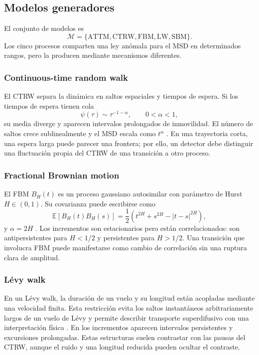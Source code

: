 \documentclass[a4paper,12pt]{article}
\newcommand{\E}{\mathbb{E}}
\newcommand{\Mset}{\mathcal{M}}
\begin{document}
\subsection{Modelos generadores}

El conjunto de modelos es
\[
  \Mset=\{\mathrm{ATTM},\mathrm{CTRW},\mathrm{FBM},\mathrm{LW},\mathrm{SBM}\}.
\]
Los cinco procesos comparten una ley anómala para el MSD en determinados rangos, pero la producen mediante mecanismos diferentes.

\subsubsection{Continuous-time random walk}

El CTRW separa la dinámica en saltos espaciales y tiempos de espera. Si los tiempos de espera tienen cola
\begin{equation}
  \psi(\tau)\sim \tau^{-1-\alpha},\qquad 0<\alpha<1,
\end{equation}
su media diverge y aparecen intervalos prolongados de inmovilidad. El número de saltos crece sublinealmente y el MSD escala como $t^{\alpha}$ \cite{montroll1965random,metzler2000random}. En una trayectoria corta, una espera larga puede parecer una frontera; por ello, un detector debe distinguir una fluctuación propia del CTRW de una transición a otro proceso.

\subsubsection{Fractional Brownian motion}

El FBM $B_H(t)$ es un proceso gaussiano autosimilar con parámetro de Hurst $H\in(0,1)$. Su covarianza puede escribirse como
\begin{equation}
  \E[B_H(t)B_H(s)]=\frac{1}{2}\left(t^{2H}+s^{2H}-|t-s|^{2H}\right),
  \label{eq:fbm-cov}
\end{equation}
y $\alpha=2H$ \cite{mandelbrot1968fractional}. Los incrementos son estacionarios pero están correlacionados: son antipersistentes para $H<1/2$ y persistentes para $H>1/2$. Una transición que involucra FBM puede manifestarse como cambio de correlación sin una ruptura clara de amplitud.

\subsubsection{Lévy walk}

En un Lévy walk, la duración de un vuelo y su longitud están acopladas mediante una velocidad finita. Esta restricción evita los saltos instantáneos arbitrariamente largos de un vuelo de Lévy y permite describir transporte superdifusivo con una interpretación física \cite{zaburdaev2015levy}. En los incrementos aparecen intervalos persistentes y excursiones prolongadas. Estas estructuras suelen contrastar con las pausas del CTRW, aunque el ruido y una longitud reducida pueden ocultar el contraste.
\end{document}
